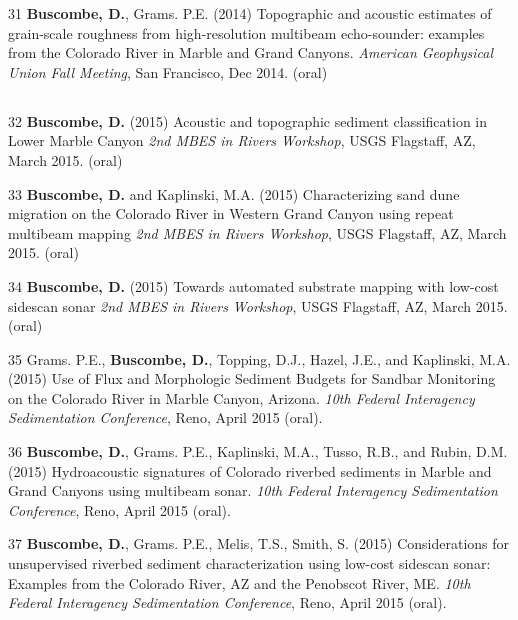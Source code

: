 \documentclass[margin,line]{resume}
\begin{document}
\begin{resume}
\begin{footnotesize}
\begin{list1}
        \item[31] {\bf Buscombe, D.}, Grams. P.E. (2014) Topographic and acoustic estimates of grain-scale roughness from high-resolution multibeam echo-sounder: examples from the Colorado River in Marble and Grand Canyons. {\sl American Geophysical Union Fall Meeting}, San Francisco, Dec 2014. (oral)
	\end{list1}

	\subsection{}
	\begin{list1}
	
        \item[32] {\bf Buscombe, D.} (2015) Acoustic and topographic sediment classification in Lower Marble Canyon {\sl 2nd MBES in Rivers Workshop}, USGS Flagstaff, AZ, March 2015. (oral)\\
        
        \item[33] {\bf Buscombe, D.} and Kaplinski, M.A. (2015) Characterizing sand dune migration on the Colorado River in Western Grand Canyon using repeat multibeam mapping {\sl 2nd MBES in Rivers Workshop}, USGS Flagstaff, AZ, March 2015. (oral)\\

        \item[34] {\bf Buscombe, D.} (2015) Towards automated substrate mapping with low-cost sidescan sonar {\sl 2nd MBES in Rivers Workshop}, USGS Flagstaff, AZ, March 2015. (oral)\\

        \item[35] Grams. P.E., {\bf Buscombe, D.}, Topping, D.J., Hazel, J.E., and Kaplinski, M.A. (2015) Use of Flux and Morphologic Sediment Budgets for Sandbar Monitoring on the Colorado River in Marble Canyon, Arizona. {\sl 10th Federal Interagency Sedimentation Conference}, Reno, April 2015 (oral).\\

        \item[36] {\bf Buscombe, D.}, Grams. P.E., Kaplinski, M.A., Tusso, R.B., and Rubin, D.M. (2015) Hydroacoustic signatures of Colorado riverbed sediments in Marble and Grand Canyons using multibeam sonar. {\sl 10th Federal Interagency Sedimentation Conference}, Reno, April 2015 (oral).\\

        \item[37] {\bf Buscombe, D.}, Grams. P.E., Melis, T.S., Smith, S. (2015) Considerations for unsupervised riverbed sediment characterization using low-cost sidescan sonar: Examples from the Colorado River, AZ and the Penobscot River, ME. {\sl 10th Federal Interagency Sedimentation Conference}, Reno, April 2015 (oral).\\


\end{list1}
\end{footnotesize}
\end{resume}
\end{document}

